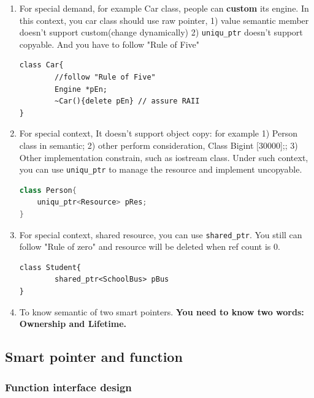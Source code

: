 \documentclass[a4paper,11pt,twoside]{book}
\begin{document}
\begin{itemize}
\begin{enumerate}
		\item  For special demand, for example Car class,  people can \textbf{custom} its engine. In this context, you car class should use raw pointer, 1) value semantic member doesn't support custom(change dynamically) 2) \texttt{uniqu\_ptr} doesn't support copyable.  And you have to follow "Rule of Five"
\begin{lstlisting}[numbers=none]
class Car{
		//follow "Rule of Five"
		Engine *pEn;
		~Car(){delete pEn} // assure RAII
}
\end{lstlisting}
		
		\item For special context, It doesn't support object copy: for example 1) Person class in semantic;  2) other  perform consideration, Class Big{int [30000];};  3) Other implementation constrain, such as iostream class. Under such context, you can use \texttt{uniqu\_ptr} to manage the resource and implement uncopyable.
\begin{lstlisting}[frame=single, language=c++]
class Person{
    uniqu_ptr<Resource> pRes;
}
\end{lstlisting}
		
		\item For special context, shared resource, you can use \texttt{shared\_ptr}.  You still can follow "Rule of zero" and resource will be deleted when ref count is 0.
\begin{lstlisting}[numbers=none]
class Student{
		shared_ptr<SchoolBus> pBus
}
\end{lstlisting}
		\item To know semantic of two smart pointers. \textbf{You need to know two words: Ownership and Lifetime.}
	\end{enumerate}
\end{itemize}

\subsection{Smart pointer and function}
\subsubsection{Function interface design}
\end{document}
